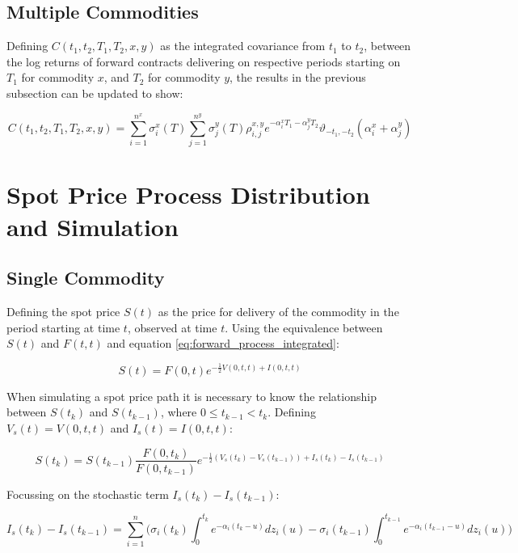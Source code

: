 \documentclass{article}
\begin{document}
\subsection{Multiple Commodities}
Defining $C(t_1, t_2, T_1, T_2, x, y)$
as the integrated covariance from $t_1$ to $t_2$, between the log returns of forward 
contracts delivering on respective periods starting on $T_1$ for commodity $x$,
and $T_2$ for commodity $y$, the results in the previous subsection can be updated
to show:

\begin{equation}
    C(t_1, t_2, T_1, T_2, x, y) = \sum_{i=1}^{n^x} \sigma_i^x(T) \sum_{j=1}^{n^y} 
    \sigma_j^y(T) \rho_{i,j}^{x, y} 
    e^{-\alpha_i^x T_1 -\alpha_j^y T_2} \vartheta_{-t_1, -t_2}(\alpha_i^x + \alpha_j^y)
\end{equation}


\section{Spot Price Process Distribution and Simulation}
\label{appendix:spot_distribution}
\subsection{Single Commodity}
Defining the spot price $S(t)$ as the price for delivery of the commodity in the period
starting at time $t$, observed at time $t$. Using the equivalence between $S(t)$
and $F(t, t)$ and equation \ref{eq:forward_process_integrated}:

\begin{equation}
    S(t) = F(0, t)e^{- \frac{1}{2} V(0, t, t) + I(0, t, t)}
\end{equation}

When simulating a spot price path it is necessary to know the relationship between
$S(t_k)$ and $S(t_{k-1})$, where $0 \leq t_{k-1} < t_k$. Defining $V_s(t)=V(0, t, t)$ and 
$I_s(t)=I(0, t, t)$:

\begin{equation}
    S(t_k) = S(t_{k-1}) \frac{F(0, t_k)}{F(0, t_{k-1})} e^{- \frac{1}{2} (V_s(t_k) - 
    V_s(t_{k-1})) + I_s(t_k) - I_s(t_{k-1})}
\end{equation}

Focussing on the stochastic term $I_s(t_k) - I_s(t_{k-1})$:

\begin{equation}
    I_s(t_k) - I_s(t_{k-1}) = \sum_{i=1}^n \biggl( \sigma_i(t_k) 
    \int_0^{t_k} e^{-\alpha_i(t_k-u)} dz_i(u) - \sigma_i(t_{k-1}) 
    \int_0^{t_{k-1}} e^{-\alpha_i(t_{k-1}-u)} dz_i(u) \biggr)
\end{equation}
\end{document}
